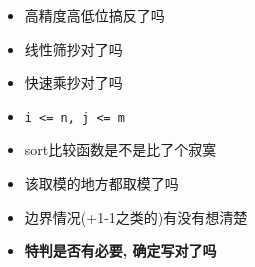 \noindent
\begin{itemize}
    \item 高精度高低位搞反了吗
    \item 线性筛抄对了吗
    \item 快速乘抄对了吗
    \item \texttt{i <= n, j <= m}
    \item sort比较函数是不是比了个寂寞
    \item 该取模的地方都取模了吗
    \item 边界情况(+1-1之类的)有没有想清楚
    \item \bfseries{特判是否有必要, 确定写对了吗}
\end{itemize}